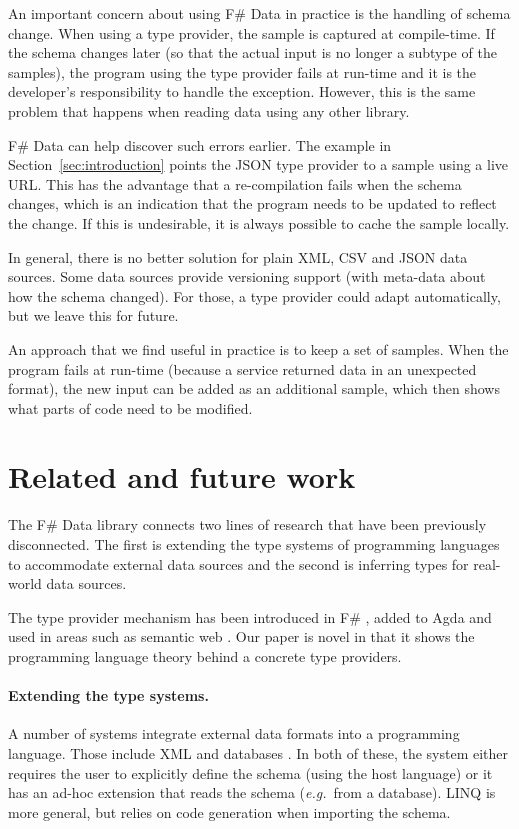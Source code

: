 \documentclass[preprint]{sigplanconf}
\begin{document}
An important concern about using F\# Data in practice is the handling of schema change. When using a
type provider, the sample is captured at compile-time. If the schema changes later (so that the actual
input is no longer a subtype of the samples), the program using the type provider fails at run-time
and it is the developer's responsibility to handle the exception. However, this is the same problem that
happens when reading data using any other library.

F\# Data can help discover such errors earlier. The example in Section~\ref{sec:introduction}
points the JSON type provider to a sample using a live URL. This has the advantage that a re-compilation 
fails when the schema changes, which is an indication that the program needs to be updated to reflect the
change. If this is undesirable, it is always possible to cache the sample locally.

In general, there is no better solution for plain XML, CSV and JSON data sources. Some data sources provide 
versioning support (with meta-data about how the schema changed). For those, a type 
provider could adapt automatically, but we leave this for future.

An approach that we find useful in practice is to keep a set of samples. When the program fails at run-time
(because a service returned data in an unexpected format), the new input can be added as an additional sample,
which then shows what parts of code need to be modified.


\section{Related and future work}
\label{sec:related}

The F\# Data library connects two lines of research that have been previously disconnected. The first is 
extending the type systems of programming languages to accommodate external data sources and the second
is inferring types for real-world data sources.

The type provider mechanism has been introduced in F\# \cite{fsharp-typeprov,fsharp-typeprov-ddfp}, 
added to Agda \cite{agda-tp} and used in areas such as semantic web \cite{liteq}. Our paper is novel 
in that it shows the programming language theory behind a concrete type providers. 

\paragraph{Extending the type systems.} 
A number of systems integrate external data formats into a programming language. Those include 
XML \cite{xduce,xduce-ml} and databases \cite{links}. In both of these, the system either requires
the user to explicitly define the schema (using the host language) or it has an ad-hoc extension 
that reads the schema (\emph{e.g.}~from a database). LINQ \cite{linq} is more general, but relies
on code generation when importing the schema.
\end{document}
